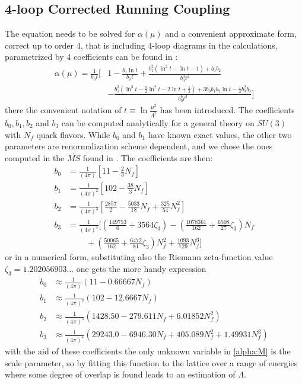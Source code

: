 \subsection{4-loop Corrected Running Coupling}
\label{sec:4loop}
The equation needs to be solved for $\alpha(\mu)$ and a convenient approximate form, correct up to order 4, that is including 4-loop diagrams in the calculations, parametrized by 4 coefficients can be found in \cite{dissertori_9._2016-1}:
\begin{align}
    \alpha(\mu) = \frac{1}{b_0t} \bigg[& 1 - \frac{b_1\ln t}{b_0t}  + \frac{b_1^2(\ln^2t - \ln t - 1) + b_0b_2}{b_0^4t^2}\\\nonumber
    & - \frac{b_1^3(\ln^3t - \frac{5}{2}\ln^2 t - 2\ln t + \frac{1}{2}) + 3b_0b_1b_2\ln t - \frac{1}{2}b_0^2b_3}{b_0^6t^3}\bigg]
    \label{alpha}
\end{align}
there the convenient notation of $t\equiv\ln\frac{\mu^2}{\Lambda^2}$ has been introduced. The coefficients $b_0, b_1,b_2$ and $b_3$ can be computed analytically for a general theory on $SU(3)$ with $N_f$ quark flavors. While $b_0$ and $b_1$ have known exact values, the other two parameters are renormalization scheme dependent, and we chose the ones computed in the $\overline{MS}$ found in \cite{van_ritbergen_four-loop_1997}. The coefficients are then: 
\begin{align}
    b_0 &= \frac{1}{(4\pi)}   \left[11 - \frac{2}{3}N_f\right] \\\nonumber
    b_1 &= \frac{1}{(4\pi)^2} \left[102 - \frac{38}{3}N_f\right] \\\nonumber
    b_2 &= \frac{1}{(4\pi)^3} \left[\frac{2857}{2} - \frac{5033}{18}N_f + \frac{325}{54}N_f^2\right] \\\nonumber
    b_3 &= \frac{1}{(4\pi)^4} \bigg[\left(\frac{149753}{6} + 3564\zeta_3\right)  - \left(\frac{1078361}{162}+ \frac{6508}{27}\zeta_3\right) N_f  \\\nonumber
    & ~~~~~~~~~~+ \left(\frac{50065}{162}  + \frac{6472}{81}\zeta_3\right)N_f^2 + \frac{1093}{729}N_f^3 \bigg] 
\end{align} 
or in a numerical form, substituting also the Riemann zeta-function value $\zeta_3 = 1.202056903\dots$ one gets the more handy expression
\begin{align}
    b_0 &\approx \frac{1}{(4\pi)} (11-0.66667N_f)\\\nonumber
    b_1 &\approx \frac{1}{(4\pi)^2} (102-12.6667N_f)\\\nonumber
    b_2 &\approx \frac{1}{(4\pi)^3} (1428.50-279.611N_f+ 6.01852N_f^2)\\\nonumber
    b_3 &\approx \frac{1}{(4\pi)^4} (29243.0-6946.30N_f+ 405.089N_f^2+ 1.49931N_f^3)
\end{align}
with the aid of these coefficients the only unknown variable in \cref{alpha:M} is the scale parameter, so by fitting this function to the lattice over a range of energies where some degree of overlap is found leads to an estimation of $\Lambda$. 